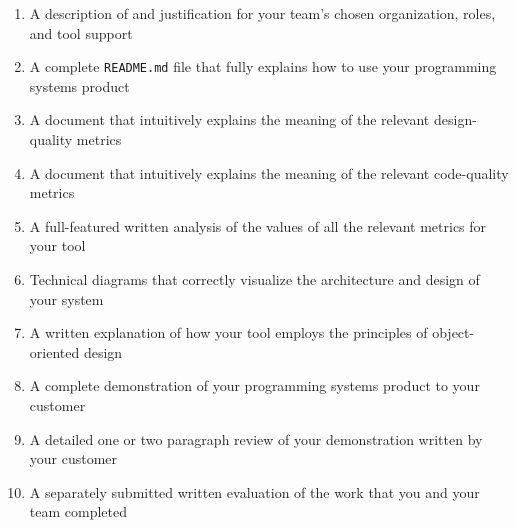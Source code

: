 \vspace*{-.1in}
\begin{enumerate}
  \itemsep0em
  \item A description of and justification for your team's chosen organization, roles, and tool support
  \item A complete {\tt README.md} file that fully explains how to use your programming systems product
  \item A document that intuitively explains the meaning of the relevant design-quality metrics
  \item A document that intuitively explains the meaning of the relevant code-quality metrics
  \item A full-featured written analysis of the values of all the relevant metrics for your tool
  \item Technical diagrams that correctly visualize the architecture and design of your system
  \item A written explanation of how your tool employs the principles of object-oriented design
  \item A complete demonstration of your programming systems product to your customer
  \item A detailed one or two paragraph review of your demonstration written by your customer
  \item A separately submitted written evaluation of the work that you and your team completed
\end{enumerate}
\vspace*{-.1in}



